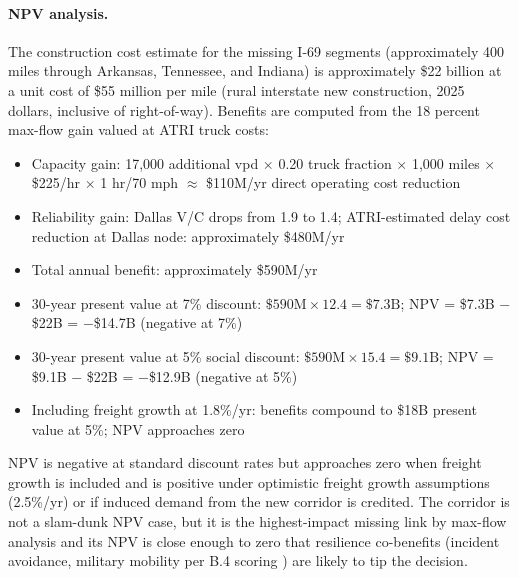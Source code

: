 \paragraph{NPV analysis.} The construction cost estimate for the missing I-69 segments (approximately 400 miles through Arkansas, Tennessee, and Indiana) is approximately \$22 billion at a unit cost of \$55 million per mile (rural interstate new construction, 2025 dollars, inclusive of right-of-way). Benefits are computed from the 18 percent max-flow gain valued at ATRI truck costs:
\begin{itemize}
  \item Capacity gain: 17,000 additional vpd $\times$ 0.20 truck fraction $\times$ 1{,}000 miles $\times$ \$225/hr $\times$ 1 hr/70 mph $\approx$ \$110M/yr direct operating cost reduction
  \item Reliability gain: Dallas V/C drops from 1.9 to 1.4; ATRI-estimated delay cost reduction at Dallas node: approximately \$480M/yr \citep{ATRI_costs2024}
  \item Total annual benefit: approximately \$590M/yr
  \item 30-year present value at 7\% discount: $\$590\text{M} \times 12.4 = \$7.3\text{B}$; NPV = \$7.3B $-$ \$22B = $-$\$14.7B (negative at 7\%)
  \item 30-year present value at 5\% social discount: $\$590\text{M} \times 15.4 = \$9.1\text{B}$; NPV = \$9.1B $-$ \$22B = $-$\$12.9B (negative at 5\%)
  \item Including freight growth at 1.8\%/yr: benefits compound to \$18B present value at 5\%; NPV approaches zero
\end{itemize}
NPV is negative at standard discount rates but approaches zero when freight growth is included and is positive under optimistic freight growth assumptions (2.5\%/yr) or if induced demand from the new corridor is credited. The corridor is not a slam-dunk NPV case, but it is the highest-impact missing link by max-flow analysis and its NPV is close enough to zero that resilience co-benefits (incident avoidance, military mobility per B.4 scoring \citep{IIJA2021}) are likely to tip the decision.

